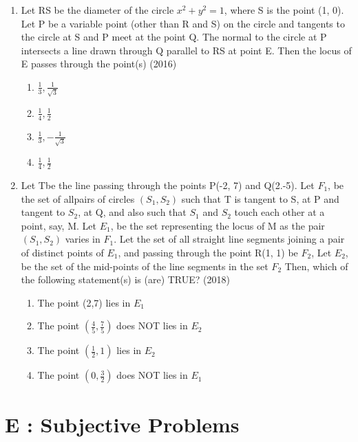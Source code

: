 \documentclass[12pt]{article}
\begin{document}
\begin{enumerate}
\begin{enumerate}
\end{enumerate}
\item Let RS be the diameter of the circle $x^2+y^2=1$, where S is the point (1, 0). Let P be a variable point (other than R and S) on the circle and tangents to the circle at S and P meet at the point Q. The normal to the circle at P intersects a line drawn through Q parallel to RS at point E. Then the locus of E passes through the point(s) (2016)
\begin{enumerate}
\item $\frac{1}{3},\frac{1}{\sqrt{3}}$
\item $\frac{1}{4},\frac{1}{2}$
\item $\frac{1}{3},-\frac{1}{\sqrt{3}}$
\item $\frac{1}{4},\frac{1}{2}$ 
\end{enumerate}
\item Let Tbe the line passing through the points P(-2, 7) and Q(2.-5). Let $F_1$, be the set of allpairs of circles $(S_1, S_2)$ such that T is tangent to S, at P and tangent to $S_2$, at Q, and also such that $S_1$ and $S_2$ touch each other at a point, say, M. Let $E_1$, be the set representing the locus of M as the pair $(S_1, S_2)$ varies in $F_1$. Let the set of all straight line segments joining a pair of distinct points of $E_1$, and passing through the point R(1, 1) be $F_2$, Let $E_2$, be the set of the mid-points of the line segments in the set $F_2$ Then, which of the following statement(s) is (are) TRUE? (2018)
\begin{enumerate}
\item The point (2,7) lies in $E_1$
\item The point $(\frac{4}{5},\frac{7}{5})$ does NOT lies in $E_2$
\item The point $(\frac{1}{2},1)$ lies in $E_2$
\item  The point $(0,\frac{3}{2})$ does NOT lies in $E_1$
\end{enumerate}
\end{enumerate}
\section*{E  :  Subjective Problems}
\end{document}

